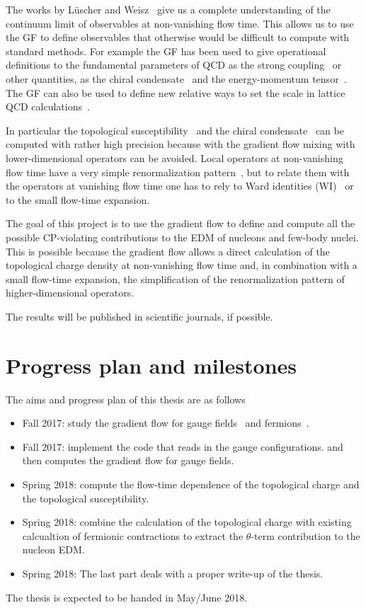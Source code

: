 \documentclass[aps,prc,twocolumn,showpacs,floatfix,nofootinbib,preprintnumbers,superscriptaddress,amsmath,amssymb]{revtex4-1}
\begin{document}
The works by L\"uscher and Weisz~\cite{Luscher:2010iy,Luscher:2011bx,Luscher:2013cpa}
give us a complete understanding of the continuum limit
of observables at non-vanishing flow time. This allows us to use the GF
to define observables that otherwise would be difficult
to compute with standard methods.
For example the GF has been used to give operational definitions to the
fundamental parameters of QCD as the strong coupling~\cite{Luscher:2010iy,Fodor:2012td,Fritzsch:2013je}
or other quantities, as the chiral condensate~\cite{Luscher:2013cpa}
and the energy-momentum tensor~\cite{Suzuki:2013gza,DelDebbio:2013zaa}.
The GF can also be used to define new relative ways to set the scale in 
lattice QCD calculations~\cite{Luscher:2010iy,Borsanyi:2012zs}.

In particular the topological susceptibility~\cite{Luscher:2010iy} and the chiral condensate~\cite{Luscher:2013cpa}
can be computed with rather high precision because with the gradient flow 
mixing with lower-dimensional operators can be avoided.
Local operators at non-vanishing flow time have a very simple renormalization pattern~\cite{Luscher:2010iy,Luscher:2011bx,Luscher:2013cpa},
but to relate them with the operators at vanishing flow time one has to rely to 
Ward identities (WI)~\cite{Luscher:2013cpa,DelDebbio:2013zaa,Shindler:2013bia} or to the small flow-time expansion.

The goal of this project is to use the gradient flow to define and compute all the 
possible CP-violating contributions to the EDM of nucleons and few-body nuclei.
This is possible because the gradient flow allows 
a direct calculation of the topological charge density at non-vanishing flow time
and, in combination with a small flow-time expansion, the simplification
of the renormalization pattern of higher-dimensional operators. 

The results will be published in scientific journals, if possible.

\section*{Progress plan and milestones}
The aims and progress plan of this thesis are as follows
\begin{itemize}
\item Fall 2017: study the gradient flow for gauge fields~\cite{Luscher:2010iy} and fermions~\cite{Luscher:2013cpa}.
\item Fall 2017: implement the code that reads in the gauge configurations.
and then computes the gradient flow for gauge fields.
\item Spring 2018: compute the flow-time dependence of the topological charge and the topological susceptibility. 
\item Spring 2018: combine the calculation of the topological charge with existing calcualtion of fermionic contractions
to extract the $\theta$-term contribution to the nucleon EDM.
\item Spring 2018: The last part deals with a proper write-up of the thesis. 
\end{itemize}
 

The thesis is expected to be handed in May/June 2018.


%

\end{document}
